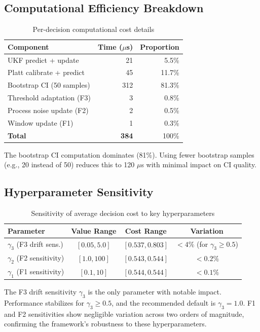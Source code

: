 \documentclass[12pt,a4paper]{article}
\begin{document}
\subsection{Computational Efficiency Breakdown}

\begin{table}[h]
\centering
\caption{Per-decision computational cost details}
\label{tab:efficiency}
\begin{tabular}{lrr}
\toprule
Component & Time ($\mu$s) & Proportion \\
\midrule
UKF predict + update & 21 & 5.5\% \\
Platt calibrate + predict & 45 & 11.7\% \\
Bootstrap CI (50 samples) & 312 & 81.3\% \\
Threshold adaptation (F3) & 3 & 0.8\% \\
Process noise update (F2) & 2 & 0.5\% \\
Window update (F1) & 1 & 0.3\% \\
\textbf{Total} & \textbf{384} & 100\% \\
\bottomrule
\end{tabular}
\end{table}

The bootstrap CI computation dominates (81\%). Using fewer bootstrap samples (e.g., 20 instead of 50) reduces this to 120 $\mu$s with minimal impact on CI quality.


\subsection{Hyperparameter Sensitivity}

\begin{table}[h]
\centering
\caption{Sensitivity of average decision cost to key hyperparameters}
\label{tab:sensitivity}
\begin{tabular}{lccc}
\toprule
Parameter & Value Range & Cost Range & Variation \\
\midrule
$\gamma_3$ (F3 drift sens.) & $[0.05, 5.0]$ & $[0.537, 0.803]$ & $<4\%$ (for $\gamma_3 \geq 0.5$) \\
$\gamma_2$ (F2 sensitivity) & $[1.0, 100]$ & $[0.543, 0.544]$ & $<0.2\%$ \\
$\gamma_1$ (F1 sensitivity) & $[0.1, 10]$ & $[0.544, 0.544]$ & $<0.1\%$ \\
\bottomrule
\end{tabular}
\end{table}

The F3 drift sensitivity $\gamma_3$ is the only parameter with notable impact. 
Performance stabilizes for $\gamma_3 \geq 0.5$, and the recommended default is $\gamma_3 = 1.0$.
F1 and F2 sensitivities show negligible variation across two orders of magnitude, 
confirming the framework's robustness to these hyperparameters.
\end{document}
